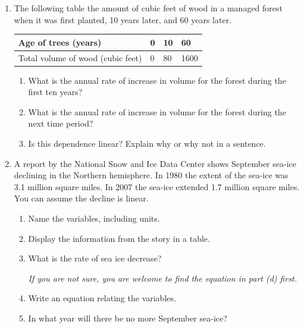 \documentclass[12pt]{article}
\begin{document}
\begin{enumerate}

\item The following table the amount of cubic feet of wood in a managed forest when it was first planted, 10 years later, and 60 years later.

\begin{center}
\begin{tabular} {|l||l|l|l|} \hline
Age of trees (years) & 0 & 10 & 60  \\ \hline
Total volume of wood (cubic feet) & 0 & 80 & 1600 \\ \hline
\end{tabular}
\end{center}

\begin{enumerate}
\item What is the annual rate of increase in volume for the forest during the first ten years?
\vfill
\item What is the annual rate of increase in volume for the forest during the next time period?
\vfill
\item Is this dependence linear? Explain why or why not in a sentence.
\vfill
\end{enumerate}

\newpage %

\item A report by the National Snow and Ice Data Center shows September sea-ice declining in the Northern hemisphere. In 1980 the extent of the sea-ice was 3.1 million square miles.  In 2007 the sea-ice extended 1.7 million square miles.  You can assume the decline is linear.

\begin{enumerate}
\item Name the variables, including units.
\vfill
\item Display the information from the story in a table.
\vfill
\item What is the rate of sea ice decrease?

\emph{If you are not sure, you are welcome to find the equation in part (d) first.}
\vfill
\item Write an equation relating the variables.
\vfill
\item In what year will there be no more September sea-ice?
\vfill
\end{enumerate}


\end{enumerate}
\end{document}
